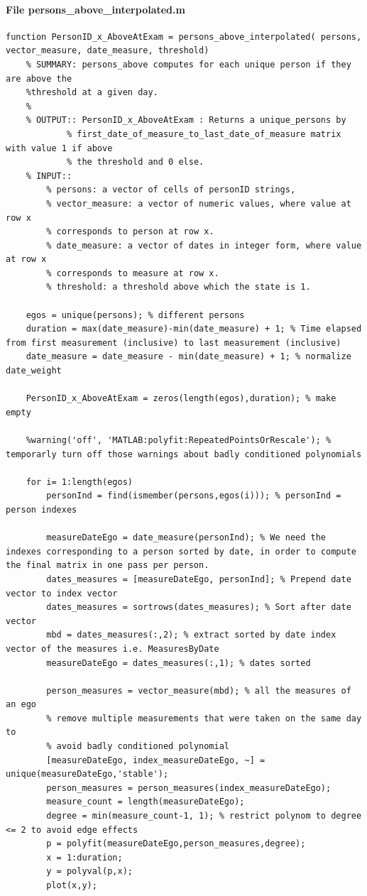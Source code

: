\documentclass[11pt]{article}
\begin{document}
\paragraph{File persons\_above\_interpolated.m}
\begin{verbatim}
function PersonID_x_AboveAtExam = persons_above_interpolated( persons, vector_measure, date_measure, threshold)
    % SUMMARY: persons_above computes for each unique person if they are above the
    %threshold at a given day.
    %
    % OUTPUT:: PersonID_x_AboveAtExam : Returns a unique_persons by
            % first_date_of_measure_to_last_date_of_measure matrix with value 1 if above
            % the threshold and 0 else.
    % INPUT::
        % persons: a vector of cells of personID strings,
        % vector_measure: a vector of numeric values, where value at row x
        % corresponds to person at row x.
        % date_measure: a vector of dates in integer form, where value at row x
        % corresponds to measure at row x.
        % threshold: a threshold above which the state is 1.

    egos = unique(persons); % different persons
    duration = max(date_measure)-min(date_measure) + 1; % Time elapsed from first measurement (inclusive) to last measurement (inclusive)
    date_measure = date_measure - min(date_measure) + 1; % normalize date_weight

    PersonID_x_AboveAtExam = zeros(length(egos),duration); % make empty

    %warning('off', 'MATLAB:polyfit:RepeatedPointsOrRescale'); % temporarly turn off those warnings about badly conditioned polynomials

    for i= 1:length(egos)
        personInd = find(ismember(persons,egos(i))); % personInd = person indexes

        measureDateEgo = date_measure(personInd); % We need the indexes corresponding to a person sorted by date, in order to compute the final matrix in one pass per person.
        dates_measures = [measureDateEgo, personInd]; % Prepend date vector to index vector
        dates_measures = sortrows(dates_measures); % Sort after date vector
        mbd = dates_measures(:,2); % extract sorted by date index vector of the measures i.e. MeasuresByDate
        measureDateEgo = dates_measures(:,1); % dates sorted

        person_measures = vector_measure(mbd); % all the measures of an ego
        % remove multiple measurements that were taken on the same day to
        % avoid badly conditioned polynomial
        [measureDateEgo, index_measureDateEgo, ~] = unique(measureDateEgo,'stable');
        person_measures = person_measures(index_measureDateEgo);
        measure_count = length(measureDateEgo);
        degree = min(measure_count-1, 1); % restrict polynom to degree <= 2 to avoid edge effects
        p = polyfit(measureDateEgo,person_measures,degree);
        x = 1:duration;
        y = polyval(p,x);
        plot(x,y);



\end{verbatim}
\end{document}
